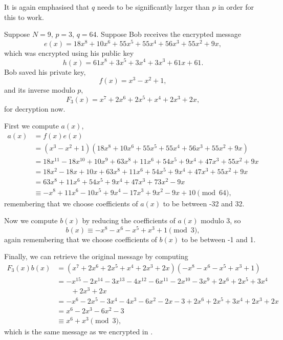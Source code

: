 It is again emphasised that $q$ needs to be significantly larger than $p$ in order for this to work.

\begin{example}
    Suppose $N = 9$, $p = 3$, $q = 64$. Suppose Bob receives the encrypted message
    \[
        e(x) = 18x^8 + 10x^6 + 55x^5 + 55x^4 + 56x^3 + 55x^2 + 9x,
    \]
    which was encrypted using his public key
    \[
        h(x) = 61x^8 + 3x^5 + 3x^4 + 3x^3 + 61x + 61.
    \]
    Bob saved his private key,
    \[
        f(x) = x^3 - x^2 + 1,
    \]
    and its inverse modulo $p$,
    \[
        F_3(x) = x^7 + 2x^6 + 2x^5 +x^4 + 2x^3 + 2x,
    \]
    for decryption now.

    First we compute $a(x)$,
    \begin{align*}
        a(x) &= f(x)e(x)\\
        &= (x^3 - x^2 + 1)(18x^8 + 10x^6 + 55x^5 + 55x^4 + 56x^3 + 55x^2 + 9x)\\
        &= 18x^{11} - 18x^{10} + 10x^9 + 63x^8 + 11x^6 + 54x^5 + 9x^4 + 47x^3 + 55x^2 + 9x\\
        &= 18x^2 - 18x + 10x + 63x^8 + 11x^6 + 54x^5 + 9x^4 + 47x^3 + 55x^2 + 9x\\
        &= 63x^8 + 11x^6 + 54x^5 + 9x^4 + 47x^3 + 73x^2 - 9x\\
        &\equiv -x^8 + 11x^6 - 10x^5 + 9x^4 - 17x^3 + 9x^2 - 9x + 10 \pmod{64},
    \end{align*}
    remembering that we choose coefficients of $a(x)$ to be between -32 and 32.

    Now we compute $b(x)$ by reducing the coefficients of $a(x)$ modulo 3, so
    \[
        b(x) \equiv -x^8 - x^6 - x^5 + x^3 + 1 \pmod{3},
    \]
    again remembering that we choose coefficients of $b(x)$ to be between -1 and 1.

    Finally, we can retrieve the original message by computing
    \begin{align*}
        F_3(x)b(x) &= (x^7 + 2x^6 + 2x^5 +x^4 + 2x^3 + 2x)(-x^8 - x^6 - x^5 + x^3 + 1)\\
        &= -x^{15} - 2x^{14} - 3x^{13} - 4x^{12} - 6x^{11} - 2x^{10} - 3x^9 + 2x^6 + 2x^5 + 3x^4\\
        &\quad\quad + 2x^3 + 2x\\
        &= -x^6 - 2x^5 - 3x^4 - 4x^3 - 6x^2 - 2x - 3 + 2x^6 + 2x^5 + 3x^4 + 2x^3 + 2x\\
        &= x^6 - 2x^3 - 6x^2 - 3\\
        &\equiv x^6 + x^3 \pmod{3},
    \end{align*}
    which is the same message as we encrypted in .
\end{example}

